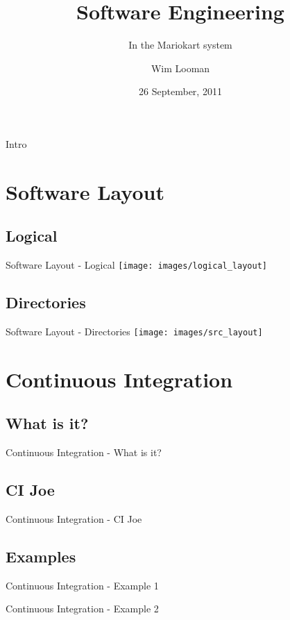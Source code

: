 \documentclass[xcolor=dvipsnames]{beamer}
\author{Wim Looman}
\title{Software Engineering}
\subtitle{In the Mariokart system}
\institute[UC]
{
  Department of Electrical Engineering\\
  University of Canterbury\\
  New Zealand
}
\date{26 September, 2011}
\begin{document}
  \begin{frame}[plain]
    \titlepage
  \end{frame}

  \begin{frame}{Intro}
    \tableofcontents
  \end{frame}

  \section{Software Layout}
    \subsection{Logical}
      \begin{frame}{Software Layout - Logical}
        \texttt{[image: images/logical\_layout]}
      \end{frame}

    \subsection{Directories}
      \begin{frame}{Software Layout - Directories}
        \texttt{[image: images/src\_layout]}
      \end{frame}

  \section{Continuous Integration}
    \subsection{What is it?}
      \begin{frame}{Continuous Integration - What is it?}
      \end{frame}

    \subsection{CI Joe}
      \begin{frame}{Continuous Integration - CI Joe}
      \end{frame}

    \subsection{Examples}
      \begin{frame}{Continuous Integration - Example 1}
      \end{frame}

      \begin{frame}{Continuous Integration - Example 2}
      \end{frame}
\end{document}
